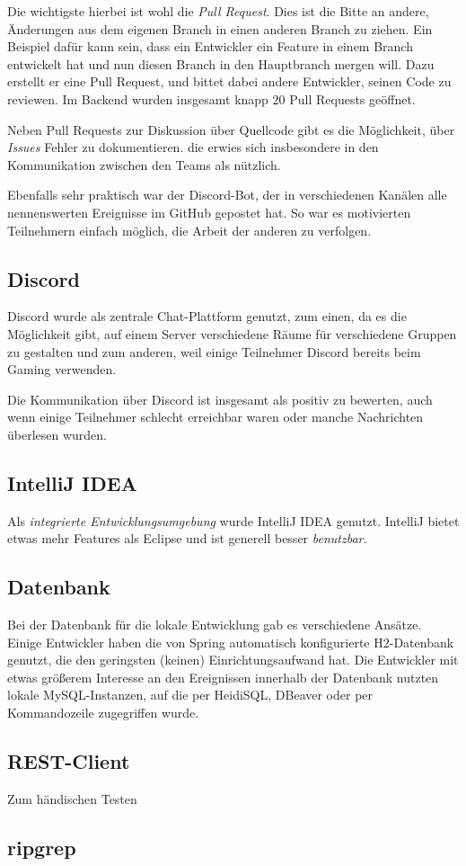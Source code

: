 \documentclass[a4paper, 11pt]{article}
\begin{document}
Die wichtigste hierbei ist wohl die \emph{Pull Request}. Dies ist die Bitte an
andere, Änderungen aus dem eigenen Branch in einen anderen Branch zu ziehen.
Ein Beispiel dafür kann sein, dass ein Entwickler ein Feature in einem Branch
entwickelt hat und nun diesen Branch in den Hauptbranch mergen will. Dazu
erstellt er eine Pull Request, und bittet dabei andere Entwickler, seinen Code
zu reviewen. Im Backend wurden insgesamt knapp 20 Pull Requests geöffnet.
 
Neben Pull Requests zur Diskussion über Quellcode gibt es die Möglichkeit, über
\emph{Issues} Fehler zu dokumentieren. die erwies sich insbesondere in den
Kommunikation zwischen den Teams als nützlich.

Ebenfalls sehr praktisch war der Discord-Bot, der in verschiedenen Kanälen alle nennenswerten Ereignisse im GitHub gepostet hat. So war es motivierten Teilnehmern einfach möglich, die Arbeit der anderen zu verfolgen.

\subsection{Discord}

Discord wurde als zentrale Chat-Plattform genutzt, zum einen, da es die
Möglichkeit gibt, auf einem Server verschiedene Räume für verschiedene Gruppen
zu gestalten und zum anderen, weil einige Teilnehmer Discord bereits beim
Gaming verwenden.

Die Kommunikation über Discord ist insgesamt als positiv zu bewerten, auch wenn
einige Teilnehmer schlecht erreichbar waren oder manche Nachrichten überlesen
wurden.

\subsection{IntelliJ IDEA}

Als \emph{integrierte Entwicklungsumgebung} wurde IntelliJ IDEA genutzt.
IntelliJ bietet etwas mehr Features als Eclipse und ist generell besser
\emph{benutzbar}.

\subsection{Datenbank}

Bei der Datenbank für die lokale Entwicklung gab es verschiedene Ansätze.
Einige Entwickler haben die von Spring automatisch konfigurierte H2-Datenbank
genutzt, die den geringsten (keinen) Einrichtungsaufwand hat. Die Entwickler
mit etwas größerem Interesse an den Ereignissen innerhalb der Datenbank nutzten
lokale MySQL-Instanzen, auf die per HeidiSQL, DBeaver oder per Kommandozeile
zugegriffen wurde.

\subsection{REST-Client}

Zum händischen Testen 

\subsection{ripgrep}
\end{document}
